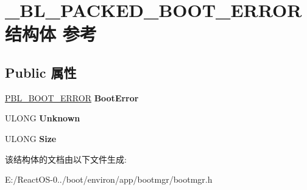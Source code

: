 \hypertarget{struct___b_l___p_a_c_k_e_d___b_o_o_t___e_r_r_o_r}{}\section{\+\_\+\+B\+L\+\_\+\+P\+A\+C\+K\+E\+D\+\_\+\+B\+O\+O\+T\+\_\+\+E\+R\+R\+O\+R结构体 参考}
\label{struct___b_l___p_a_c_k_e_d___b_o_o_t___e_r_r_o_r}
\subsection*{Public 属性}
\begin{DoxyCompactItemize}
\item 
\mbox{\label{struct___b_l___p_a_c_k_e_d___b_o_o_t___e_r_r_o_r_af037d4aeb3fc779838cef3ab02d9a0ca}} 
\hyperlink{struct___b_l___b_o_o_t___e_r_r_o_r}{P\+B\+L\+\_\+\+B\+O\+O\+T\+\_\+\+E\+R\+R\+OR} {\bfseries Boot\+Error}
\item 
\mbox{\label{struct___b_l___p_a_c_k_e_d___b_o_o_t___e_r_r_o_r_a838449b732b568940cc2e934c99f7cb8}} 
U\+L\+O\+NG {\bfseries Unknown}
\item 
\mbox{\label{struct___b_l___p_a_c_k_e_d___b_o_o_t___e_r_r_o_r_a1e84e96c50d0b27c3d4b5553f7a1304e}} 
U\+L\+O\+NG {\bfseries Size}
\end{DoxyCompactItemize}


该结构体的文档由以下文件生成\+:\begin{DoxyCompactItemize}
\item 
E\+:/\+React\+O\+S-\/0../boot/environ/app/bootmgr/bootmgr.\+h\end{DoxyCompactItemize}
